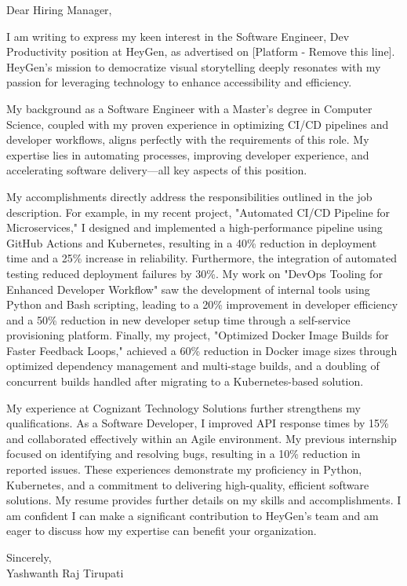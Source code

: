 \documentclass[letterpaper,11pt]{article}
\begin{document}
\begin{flushleft}
Dear Hiring Manager,

\vspace{12pt}

I am writing to express my keen interest in the Software Engineer, Dev Productivity position at HeyGen, as advertised on [Platform - Remove this line].  HeyGen's mission to democratize visual storytelling deeply resonates with my passion for leveraging technology to enhance accessibility and efficiency.

\vspace{12pt}

My background as a Software Engineer with a Master's degree in Computer Science, coupled with my proven experience in optimizing CI/CD pipelines and developer workflows, aligns perfectly with the requirements of this role.  My expertise lies in automating processes, improving developer experience, and accelerating software delivery—all key aspects of this position.

\vspace{12pt}

My accomplishments directly address the responsibilities outlined in the job description.  For example, in my recent project, "Automated CI/CD Pipeline for Microservices," I designed and implemented a high-performance pipeline using GitHub Actions and Kubernetes, resulting in a 40\% reduction in deployment time and a 25\% increase in reliability.  Furthermore, the integration of automated testing reduced deployment failures by 30\%.  My work on "DevOps Tooling for Enhanced Developer Workflow" saw the development of internal tools using Python and Bash scripting, leading to a 20\% improvement in developer efficiency and a 50\% reduction in new developer setup time through a self-service provisioning platform.  Finally, my project, "Optimized Docker Image Builds for Faster Feedback Loops," achieved a 60\% reduction in Docker image sizes through optimized dependency management and multi-stage builds, and a doubling of concurrent builds handled after migrating to a Kubernetes-based solution.

\vspace{12pt}

My experience at Cognizant Technology Solutions further strengthens my qualifications. As a Software Developer, I improved API response times by 15\% and collaborated effectively within an Agile environment. My previous internship focused on identifying and resolving bugs, resulting in a 10\% reduction in reported issues.  These experiences demonstrate my proficiency in Python, Kubernetes, and a commitment to delivering high-quality, efficient software solutions.  My resume provides further details on my skills and accomplishments.  I am confident I can make a significant contribution to HeyGen's team and am eager to discuss how my expertise can benefit your organization.


\vspace{20pt}

Sincerely, \\
\vspace{15pt}
Yashwanth Raj Tirupati

\end{flushleft}
\end{document}
